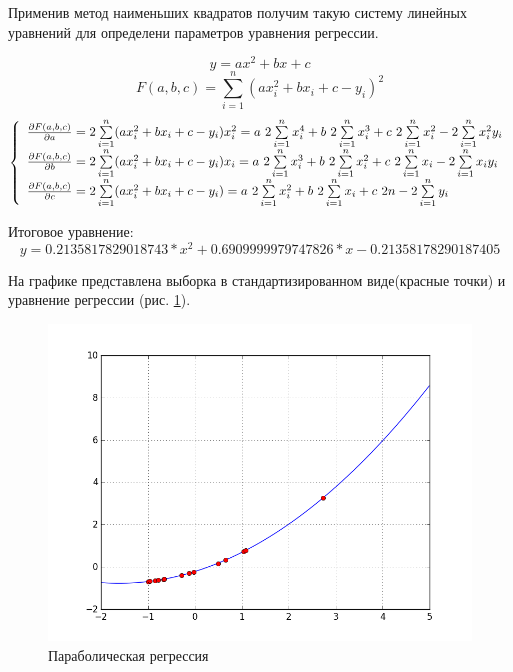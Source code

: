 \documentclass[a4paper,12pt]{article}
\begin{document}
Применив метод наименьших квадратов получим такую систему линейных уравнений для определени параметров уравнения регрессии.

$$y = ax^2 + bx + c$$
$$F(a, b, c) = \sum\limits_{i=1}^n (ax_i^2 + bx_i + c - y_i)^2$$
$$\left\{
\begin{array}{l l}

\frac{\partial F(a, b, c)}{\partial a} = 2\sum\limits_{i=1}^n (ax_i^2 + bx_i + c - y_i)x_i^2 = a\ 2\sum\limits_{i=1}^n x_i^4 + b\ 2\sum\limits_{i=1}^n x_i^3 + c\ 2\sum\limits_{i=1}^n x_i^2 - 2\sum\limits_{i=1}^n x_i^2y_i\\

\frac{\partial F(a, b, c)}{\partial b} = 2\sum\limits_{i=1}^n (ax_i^2 + bx_i + c - y_i)x_i = a\ 2\sum\limits_{i=1}^n x_i^3 + b\ 2\sum\limits_{i=1}^n x_i^2 + c\ 2\sum\limits_{i=1}^n x_i - 2\sum\limits_{i=1}^n x_iy_i\\

\frac{\partial F(a, b, c)}{\partial c} = 2\sum\limits_{i=1}^n (ax_i^2 + bx_i + c - y_i) = a\ 2\sum\limits_{i=1}^n x_i^2 + b\ 2\sum\limits_{i=1}^n x_i + c\ 2n - 2\sum\limits_{i=1}^n y_i\\
\end{array}
\right.$$

Итоговое уравнение:
$$y = 0.2135817829018743*x^2+0.6909999979747826*x-0.21358178290187405$$

На графике представлена выборка в стандартизированном виде(красные точки) и уравнение регрессии (рис. \ref{fig:im_2}). 

\begin{center}
	\begin{figure}[h]
		\centering
   		\includegraphics[scale=0.7]{figure_2.png}
   		\caption{Параболическая регрессия}
   		\label{fig:im_2}
    \end{figure}
\end{center}
\end{document}
